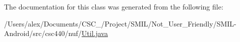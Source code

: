 The documentation for this class was generated from the following file\-:\begin{DoxyCompactItemize}
\item 
/\-Users/alex/\-Documents/\-C\-S\-C\-\_/\-Project/\-S\-M\-I\-L/\-Not\-\_\-\-User\-\_\-\-Friendly/\-S\-M\-I\-L-\/\-Android/src/csc440/nuf/\hyperlink{_s_m_i_l-_android_2src_2csc440_2nuf_2_util_8java}{Util.\-java}\end{DoxyCompactItemize}
